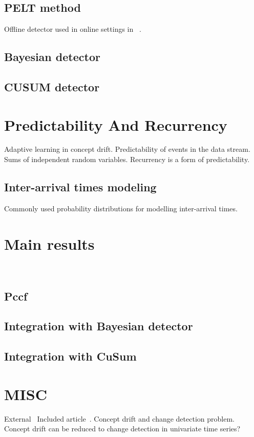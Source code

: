 \documentclass[licentiate,utf8,lot,loar,lof,shortloft,index]{jydiss}
\begin{document}
\section{PELT method}
Offline detector used in online settings in ~\cite{marrero2013aclac}.

\section{Bayesian detector}
\cite{adams2007bayesian}

\section{CUSUM detector}

\chapter{Predictability And Recurrency}
Adaptive learning in concept drift.
Predictability of events in the data stream.
~\cite{feller2008introduction}
Sums of independent random variables.
Recurrency is a form of predictability.

\section{Inter-arrival times modeling}
Commonly used probability distributions for modelling inter-arrival times.


\chapter{Main results}
~\cite{MaslovSDM2016, MaslovIJCNN2017}
\section{Pccf}
\section{Integration with Bayesian detector}
\section{Integration with CuSum}

\chapter{MISC}
External~\cite{shewhart1931economic}
Included article~\cite{sha1}.
Concept drift and change detection problem.
Concept drift can be reduced to change detection in univariate time series?
\end{document}
